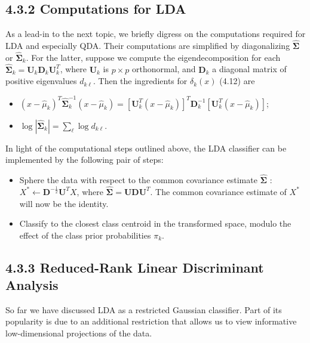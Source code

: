 \documentclass[10pt]{article}
\begin{document}
\subsection*{4.3.2 Computations for LDA}
As a lead-in to the next topic, we briefly digress on the computations required for LDA and especially QDA. Their computations are simplified by diagonalizing $\hat{\boldsymbol{\Sigma}}$ or $\hat{\boldsymbol{\Sigma}}_{k}$. For the latter, suppose we compute the eigendecomposition for each $\hat{\boldsymbol{\Sigma}}_{k}=\mathbf{U}_{k} \mathbf{D}_{k} \mathbf{U}_{k}^{T}$, where $\mathbf{U}_{k}$ is $p \times p$ orthonormal, and $\mathbf{D}_{k}$ a diagonal matrix of positive eigenvalues $d_{k \ell}$. Then the ingredients for $\delta_{k}(x)$ (4.12) are

\begin{itemize}
  \item $\left(x-\hat{\mu}_{k}\right)^{T} \hat{\boldsymbol{\Sigma}}_{k}^{-1}\left(x-\hat{\mu}_{k}\right)=\left[\mathbf{U}_{k}^{T}\left(x-\hat{\mu}_{k}\right)\right]^{T} \mathbf{D}_{k}^{-1}\left[\mathbf{U}_{k}^{T}\left(x-\hat{\mu}_{k}\right)\right]$;
  \item $\log \left|\hat{\boldsymbol{\Sigma}}_{k}\right|=\sum_{\ell} \log d_{k \ell}$.
\end{itemize}

In light of the computational steps outlined above, the LDA classifier can be implemented by the following pair of steps:

\begin{itemize}
  \item Sphere the data with respect to the common covariance estimate $\hat{\boldsymbol{\Sigma}}$ : $X^{*} \leftarrow \mathbf{D}^{-\frac{1}{2}} \mathbf{U}^{T} X$, where $\hat{\boldsymbol{\Sigma}}=\mathbf{U D U}^{T}$. The common covariance estimate of $X^{*}$ will now be the identity.
  \item Classify to the closest class centroid in the transformed space, modulo the effect of the class prior probabilities $\pi_{k}$.
\end{itemize}

\subsection*{4.3.3 Reduced-Rank Linear Discriminant Analysis}
So far we have discussed LDA as a restricted Gaussian classifier. Part of its popularity is due to an additional restriction that allows us to view informative low-dimensional projections of the data.
\end{document}
